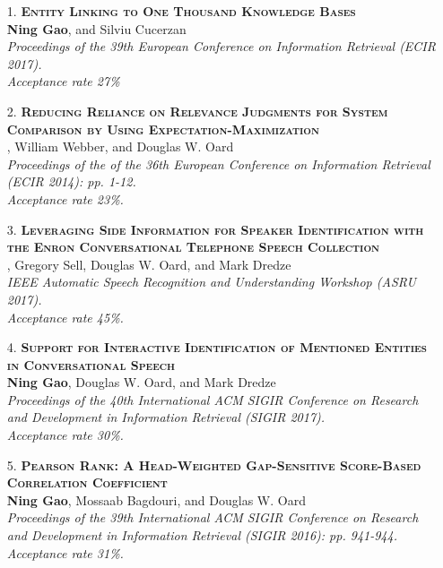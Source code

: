 \documentclass[a4paper, 11pt]{article}
\begin{document}
\begin{itemize}

\item[\color{bl3} 1.]{\scshape\color{bl3}\bf Entity Linking to One Thousand Knowledge Bases}\\
{\color{black} \textbf{Ning Gao}, and Silviu Cucerzan \\
\emph{Proceedings of the 39th European Conference on Information Retrieval (ECIR 2017).\\ Acceptance rate 27\%}}
\vspace{2mm}

\item[\color{bl3} 2.]{\scshape\color{bl3}\bf Reducing Reliance on Relevance Judgments for System Comparison by Using Expectation-Maximization}\\
, William Webber, and Douglas W. Oard\\
\emph{Proceedings of the of the 36th European Conference on Information Retrieval (ECIR 2014): pp. 1-12.\\ Acceptance rate 23\%.}
\vspace{2mm}

\item[\color{bl3} 3.]{\scshape\color{bl3}\bf Leveraging Side Information for Speaker Identification with the Enron Conversational Telephone Speech Collection}\\
, Gregory Sell, Douglas W. Oard, and Mark Dredze\\
\emph{IEEE Automatic Speech Recognition and Understanding Workshop  (ASRU 2017).\\ Acceptance rate 45\%.}
\vspace{2mm}


\item[\color{bl3} 4.]{\scshape\color{bl3}\bf Support for Interactive Identification of Mentioned Entities in Conversational Speech}\\
{\color{black} \textbf{Ning Gao}, Douglas W. Oard, and Mark Dredze \\
\emph{Proceedings of the 40th International ACM SIGIR Conference on Research and Development in Information Retrieval (SIGIR 2017).\\ Acceptance rate 30\%.}}
\vspace{2mm}

\item[\color{bl3} 5.]{\scshape\color{bl3}\bf Pearson Rank: A Head-Weighted Gap-Sensitive Score-Based Correlation Coefficient}\\
{\color{black} \textbf{Ning Gao}, Mossaab Bagdouri, and Douglas W. Oard \\
\emph{Proceedings of the 39th International ACM SIGIR Conference on Research and Development in Information Retrieval (SIGIR 2016): pp. 941-944.\\ Acceptance rate 31\%.}}
\vspace{2mm}




\end{itemize}
\end{document}

